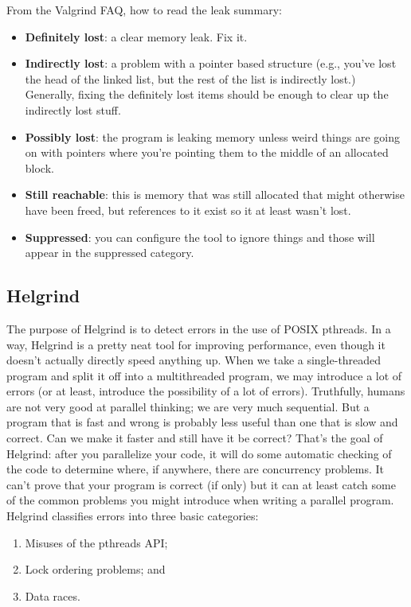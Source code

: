 \documentclass[a4paper]{report}
\begin{document}
From the Valgrind FAQ, how to read the leak summary:
\begin{itemize}
	\item \textbf{Definitely lost}: a clear memory leak. Fix it.
	\item \textbf{Indirectly lost}: a problem with a pointer based structure (e.g., you've lost the head of the linked list, but the rest of the list is indirectly lost.) Generally, fixing the definitely lost items should be enough to clear up the indirectly lost stuff.
	\item \textbf{Possibly lost}: the program is leaking memory unless weird things are going on with pointers where you're pointing them to the middle of an allocated block.
	\item \textbf{Still reachable}: this is memory that was still allocated that might otherwise have been freed, but references to it exist so it at least wasn't lost.
	\item \textbf{Suppressed}: you can configure the tool to ignore things and those will appear in the suppressed category.
\end{itemize}



\subsection*{Helgrind}  
The purpose of Helgrind is to detect errors in the use of POSIX pthreads. In a way, Helgrind is a pretty neat tool for improving performance, even though it doesn't actually directly speed anything up. When we take a single-threaded program and split it off into a multithreaded program, we may introduce a lot of errors (or at least, introduce the possibility of a lot of errors). Truthfully, humans are not very good at parallel thinking; we are very much sequential. But a program that is fast and wrong is probably less useful than one that is slow and correct. Can we make it faster and still have it be correct? That's the goal of Helgrind: after you parallelize your code, it will do some automatic checking of the code to determine where, if anywhere, there are concurrency problems. It can't prove that your program is correct (if only) but it can at least catch some of the common problems you might introduce when writing a parallel program. Helgrind classifies errors into three basic categories:

\begin{enumerate}[noitemsep]
	\item Misuses of the pthreads API;
	\item Lock ordering problems; and
	\item Data races.
\end{enumerate}
\end{document}
